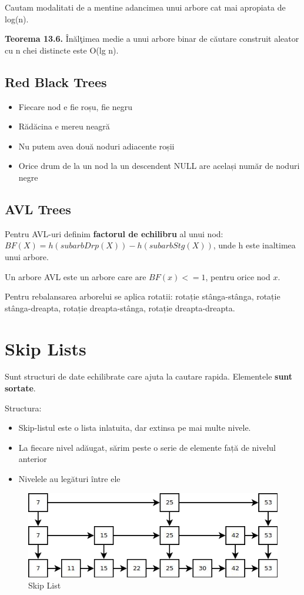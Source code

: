 \documentclass[11pt,a4paper]{article}
\theoremstyle{definition}
\theoremstyle{plain}
\theoremstyle{remark}
\begin{document}
Cautam modalitati de a mentine adancimea unui arbore cat mai apropiata de log(n).

\textbf{Teorema 13.6.} Înălţimea medie a unui arbore binar de căutare construit aleator cu n chei distincte este O(lg n).

\subsection{Red Black Trees}
\begin{itemize}
    \item Fiecare nod e ﬁe roșu, ﬁe negru
    \item Rădăcina e mereu neagră
    \item Nu putem avea două noduri adiacente roșii
    \item Orice drum de la un nod la un descendent NULL are același număr de noduri negre
\end{itemize}

\subsection{AVL Trees}
Pentru AVL-uri definim \textbf{factorul de echilibru} al unui nod: $BF(X) = h(subarbDrp(X)) - h(subarbStg(X))$, unde h este inaltimea unui arbore.

Un arbore AVL este un arbore care are $BF(x) <= 1$, pentru orice nod $x$.

Pentru rebalansarea arborelui se aplica rotatii: rotație stânga-stânga, rotație stânga-dreapta, rotație dreapta-stânga, rotație dreapta-dreapta.

\section{Skip Lists}
Sunt structuri de date echilibrate care ajuta la cautare rapida. Elementele \textbf{sunt sortate}.

Structura:
\begin{itemize}
    \item Skip-listul este o lista inlatuita, dar extinsa pe mai multe nivele.
    \item La ﬁecare nivel adăugat, sărim peste o serie de elemente față de nivelul anterior
    \item Nivelele au legături între ele
\end{itemize}

\begin{figure}[H]
    \centering
    \includegraphics[width=0.75\linewidth]{skip-lists.png}
    \caption{Skip List}
    \label{fig:enter-label}
\end{figure}
\end{document}
